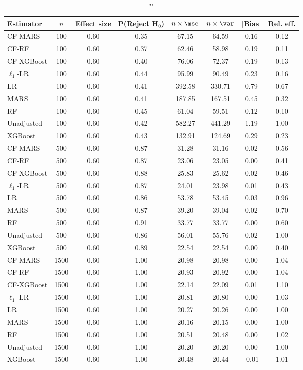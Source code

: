 \begin{table}
\centering
\caption{""}
\begin{tabular}{lccccccc}
\toprule
Estimator & $n$ & Effect size & P(Reject H$_0$) & $n\times\mse$ & $n\times \var$ & |Bias| & Rel. eff.\\ \midrule
CF-MARS & 100 & 0.60 & 0.35 &  67.15 &  64.59 &  0.16 & 0.12 \\ 
CF-RF & 100 & 0.60 & 0.37 &  62.46 &  58.98 &  0.19 & 0.11 \\ 
CF-XGBoost & 100 & 0.60 & 0.40 &  76.06 &  72.37 &  0.19 & 0.13 \\ 
$\ell_1$-LR & 100 & 0.60 & 0.44 &  95.99 &  90.49 &  0.23 & 0.16 \\ 
LR & 100 & 0.60 & 0.41 & 392.58 & 330.71 &  0.79 & 0.67 \\ 
MARS & 100 & 0.60 & 0.41 & 187.85 & 167.51 &  0.45 & 0.32 \\ 
RF & 100 & 0.60 & 0.45 &  61.04 &  59.51 &  0.12 & 0.10 \\ 
Unadjusted & 100 & 0.60 & 0.42 & 582.27 & 441.29 &  1.19 & 1.00 \\ 
XGBoost & 100 & 0.60 & 0.43 & 132.91 & 124.69 &  0.29 & 0.23 \\ \addlinespace 
CF-MARS & 500 & 0.60 & 0.87 &  31.28 &  31.16 &  0.02 & 0.56 \\ 
CF-RF & 500 & 0.60 & 0.87 &  23.06 &  23.05 &  0.00 & 0.41 \\ 
CF-XGBoost & 500 & 0.60 & 0.88 &  25.83 &  25.62 &  0.02 & 0.46 \\ 
$\ell_1$-LR & 500 & 0.60 & 0.87 &  24.01 &  23.98 &  0.01 & 0.43 \\ 
LR & 500 & 0.60 & 0.86 &  53.78 &  53.45 &  0.03 & 0.96 \\ 
MARS & 500 & 0.60 & 0.87 &  39.20 &  39.04 &  0.02 & 0.70 \\ 
RF & 500 & 0.60 & 0.91 &  33.77 &  33.77 &  0.00 & 0.60 \\ 
Unadjusted & 500 & 0.60 & 0.86 &  56.01 &  55.76 &  0.02 & 1.00 \\ 
XGBoost & 500 & 0.60 & 0.89 &  22.54 &  22.54 &  0.00 & 0.40 \\ \addlinespace 
CF-MARS & 1500 & 0.60 & 1.00 &  20.98 &  20.98 &  0.00 & 1.04 \\ 
CF-RF & 1500 & 0.60 & 1.00 &  20.93 &  20.92 &  0.00 & 1.04 \\ 
CF-XGBoost & 1500 & 0.60 & 1.00 &  22.14 &  22.09 &  0.01 & 1.10 \\ 
$\ell_1$-LR & 1500 & 0.60 & 1.00 &  20.81 &  20.80 &  0.00 & 1.03 \\ 
LR & 1500 & 0.60 & 1.00 &  20.27 &  20.26 &  0.00 & 1.00 \\ 
MARS & 1500 & 0.60 & 1.00 &  20.16 &  20.15 &  0.00 & 1.00 \\ 
RF & 1500 & 0.60 & 1.00 &  20.51 &  20.48 &  0.00 & 1.02 \\ 
Unadjusted & 1500 & 0.60 & 1.00 &  20.20 &  20.20 &  0.00 & 1.00 \\ 
XGBoost & 1500 & 0.60 & 1.00 &  20.48 &  20.44 & -0.01 & 1.01 \\
\bottomrule
\end{tabular}
\end{table}

